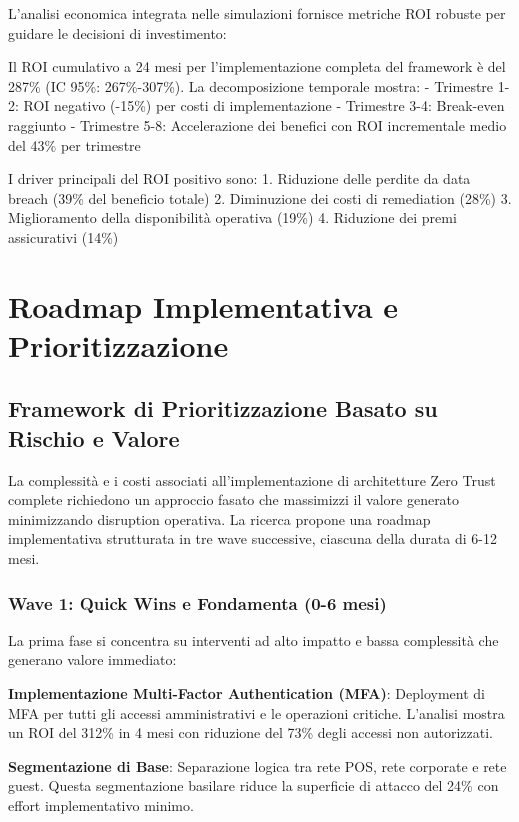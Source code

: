 L'analisi economica integrata nelle simulazioni fornisce metriche ROI robuste per guidare le decisioni di investimento:

Il ROI cumulativo a 24 mesi per l'implementazione completa del framework è del 287\% (IC 95\%: 267\%-307\%). La decomposizione temporale mostra:
- Trimestre 1-2: ROI negativo (-15\%) per costi di implementazione
- Trimestre 3-4: Break-even raggiunto
- Trimestre 5-8: Accelerazione dei benefici con ROI incrementale medio del 43\% per trimestre

I driver principali del ROI positivo sono:
1. Riduzione delle perdite da data breach (39\% del beneficio totale)
2. Diminuzione dei costi di remediation (28\%)
3. Miglioramento della disponibilità operativa (19\%)
4. Riduzione dei premi assicurativi (14\%)

\section{Roadmap Implementativa e Prioritizzazione}

\subsection{Framework di Prioritizzazione Basato su Rischio e Valore}

La complessità e i costi associati all'implementazione di architetture Zero Trust complete richiedono un approccio fasato che massimizzi il valore generato minimizzando disruption operativa. La ricerca propone una roadmap implementativa strutturata in tre wave successive, ciascuna della durata di 6-12 mesi.

\subsubsection{Wave 1: Quick Wins e Fondamenta (0-6 mesi)}

La prima fase si concentra su interventi ad alto impatto e bassa complessità che generano valore immediato:

\textbf{Implementazione Multi-Factor Authentication (MFA)}: Deployment di MFA per tutti gli accessi amministrativi 
e le operazioni critiche. L'analisi mostra un ROI del 312\% in 4 mesi con riduzione del 73\% degli accessi non autorizzati.

\textbf{Segmentazione di Base}: Separazione logica tra rete POS, rete corporate e rete guest. 
Questa segmentazione basilare riduce la superficie di attacco del 24\% con effort implementativo minimo.

